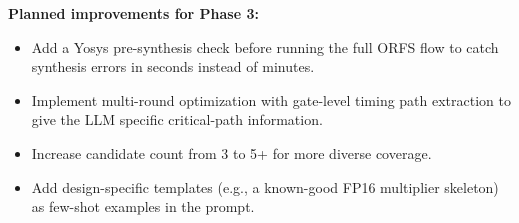 \documentclass[10pt]{article}
\begin{document}
\textbf{Planned improvements for Phase 3:}
\begin{itemize}[topsep=2pt,itemsep=0pt]
  \item Add a Yosys pre-synthesis check before running the full ORFS flow to catch synthesis errors in seconds instead of minutes.
  \item Implement multi-round optimization with gate-level timing path extraction to give the LLM specific critical-path information.
  \item Increase candidate count from 3 to 5+ for more diverse coverage.
  \item Add design-specific templates (e.g., a known-good FP16 multiplier skeleton) as few-shot examples in the prompt.
\end{itemize}
\end{document}
